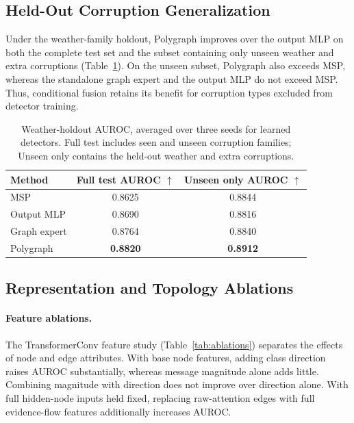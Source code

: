 \documentclass[11pt]{article}
\begin{document}
\subsection{Held-Out Corruption Generalization}
Under the weather-family holdout, Polygraph improves over the
output MLP on both the complete test set and the subset containing
only unseen weather and extra corruptions
(Table~\ref{tab:results_weather}). On the unseen subset, Polygraph also
exceeds MSP, whereas the standalone graph expert and the
output MLP do not exceed MSP. Thus, conditional fusion retains
its benefit for corruption types excluded from detector training.

\begin{table}[!htbp]
  \centering
  \small
  \setlength{\tabcolsep}{4pt}
  \renewcommand{\arraystretch}{1.08}
  \begin{tabularx}{\columnwidth}{@{}>{\raggedright\arraybackslash}Xcc@{}}
    \toprule
    Method
      & \shortstack{Full test\\AUROC $\uparrow$}
      & \shortstack{Unseen only\\AUROC $\uparrow$} \\
    \midrule
    MSP          & 0.8625          & 0.8844 \\
    Output MLP   & 0.8690          & 0.8816 \\
    Graph expert & 0.8764          & 0.8840 \\
    Polygraph    & \textbf{0.8820} & \textbf{0.8912} \\
    \bottomrule
  \end{tabularx}
  \caption{Weather-holdout AUROC, averaged over three seeds for
  learned detectors. Full test includes seen and unseen corruption
  families; Unseen only contains the held-out weather and extra
  corruptions.}
  \label{tab:results_weather}
\end{table}

\subsection{Representation and Topology Ablations}
\paragraph{Feature ablations.}
The TransformerConv feature study (Table~\ref{tab:ablations})
separates the effects of node and edge attributes. With base node
features, adding class direction raises AUROC substantially, whereas message magnitude alone adds little. Combining
magnitude with direction does not improve over direction alone.
With full hidden-node inputs held fixed, replacing raw-attention
edges with full evidence-flow features additionally increases AUROC.
\end{document}
